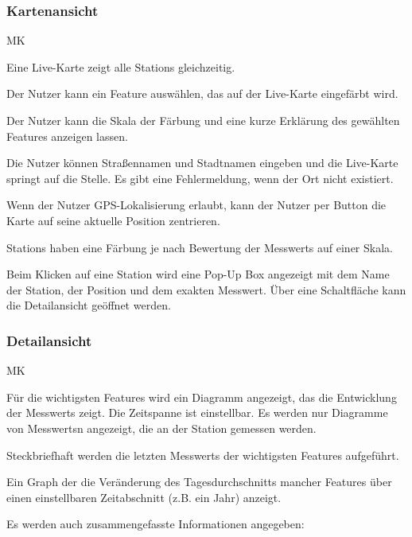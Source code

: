 \subsubsection*{\gls{Kartenansicht}}
\begin{Kriterien}{MK}

	\item Eine \gls{Live-Karte} zeigt alle \glspl{Station} gleichzeitig. 
	
	\item Der Nutzer kann ein \gls{Feature} auswählen, das auf der \gls{Live-Karte} eingefärbt wird.
	
	\item Der Nutzer kann die Skala der Färbung und eine kurze Erklärung des gewählten \gls{Feature}s anzeigen lassen.
	
	\item Die Nutzer können Straßennamen und Stadtnamen eingeben und die \gls{Live-Karte} springt auf die Stelle. 
		Es gibt eine Fehlermeldung, wenn der Ort nicht existiert.
	
	\item Wenn der Nutzer GPS-Lokalisierung erlaubt, kann der Nutzer per Button die Karte auf seine aktuelle Position zentrieren.

	\item \glspl{Station} haben eine Färbung je nach Bewertung der \glspl{Messwert} auf einer Skala.
	
	\item Beim Klicken auf eine \gls{Station} wird eine \gls{Pop-Up} Box angezeigt mit dem Name der Station, der Position und dem exakten \gls{Messwert}.
		Über eine Schaltfläche kann die \gls{Detailansicht} geöffnet werden. 
\end{Kriterien}

\subsubsection*{\gls{Detailansicht}}
\begin{Kriterien}{MK}
	\item Für die wichtigsten \glspl{Feature} wird ein Diagramm angezeigt, das die Entwicklung der \glspl{Messwert} zeigt. Die Zeitspanne ist einstellbar. Es werden nur Diagramme von \glspl{Messwert}n angezeigt, die an der \gls{Station} gemessen werden.
	
	\item Steckbriefhaft werden die letzten \glspl{Messwert} der wichtigsten \glspl{Feature} aufgeführt.

	\item Ein \gls{Graph} der die Veränderung des Tagesdurchschnitts mancher \glspl{Feature} über einen einstellbaren Zeitabschnitt (z.B. ein Jahr) anzeigt.
	
	\item Es werden auch zusammengefasste Informationen angegeben: 
\end{Kriterien}
		
